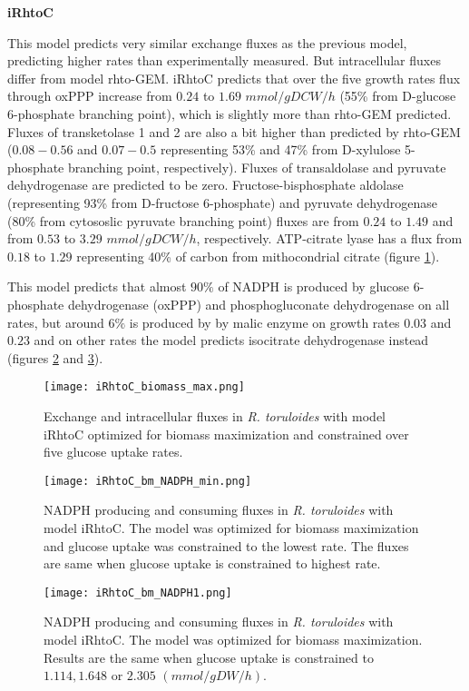 \textbf{iRhtoC}

This model predicts very similar exchange fluxes as the previous model, predicting higher rates than experimentally measured. 
But intracellular fluxes differ from model rhto-GEM. iRhtoC predicts that over the five growth rates
flux through oxPPP increase from $0.24$ to $1.69$ $mmol/gDCW/h$ (55\% from D-glucose 6-phosphate branching point), 
which is slightly more than rhto-GEM predicted.
Fluxes of transketolase 1 and 2 are also a bit higher than predicted by rhto-GEM ($0.08-0.56$ and $0.07-0.5$ representing 
53\% and 47\% from D-xylulose 5-phosphate branching point, respectively). 
Fluxes of transaldolase and pyruvate dehydrogenase are predicted to be zero. 
Fructose-bisphosphate aldolase (representing 93\% from D-fructose 6-phosphate) and pyruvate dehydrogenase (80\% from cytososlic pyruvate 
branching point) 
fluxes are from $0.24$ to $1.49$ and from $0.53$ to $3.29$ $mmol/gDCW/h$, respectively.
ATP-citrate lyase has a flux from $0.18$ to $1.29$ representing 40\% of carbon from mithocondrial citrate (figure \ref{iRhtoC_biomass_max}). 

This model predicts that almost $90\%$ of NADPH is produced by glucose 6-phosphate dehydrogenase (oxPPP) and
phosphogluconate dehydrogenase on all rates, but around $6\%$ is produced by by malic enzyme on growth rates $0.03$ and $0.23$ and on other 
rates the model predicts isocitrate dehydrogenase instead (figures \ref{fig:iRhtoC_bm_NADPH0} and \ref{fig:iRhtoC_bm_NADPH1}). 
\begin{figure}[H]
    \centering
    \texttt{[image: iRhtoC\_biomass\_max.png]}
    \caption{Exchange and intracellular fluxes in \textit{R. toruloides} with model iRhtoC optimized for biomass maximization 
    and constrained over five glucose uptake rates.}
    \label{iRhtoC_biomass_max}
\end{figure}
\begin{figure}[H]
    \centering
    \texttt{[image: iRhtoC\_bm\_NADPH\_min.png]}
    \caption{NADPH producing and consuming fluxes in \textit{R. toruloides} with model iRhtoC. The model was optimized for biomass maximization and glucose 
    uptake was constrained to the lowest rate. The fluxes are same when glucose uptake is constrained to highest rate.}
    \label{fig:iRhtoC_bm_NADPH0}
\end{figure}
\begin{figure}[H]
    \centering
    \texttt{[image: iRhtoC\_bm\_NADPH1.png]}
    \caption{NADPH producing and consuming fluxes in \textit{R. toruloides} with model iRhtoC. The model was optimized for biomass maximization. 
    Results are the same when glucose uptake is constrained to $1.114, 1.648$ or $2.305$ $(mmol/gDW/h)$.}
    \label{fig:iRhtoC_bm_NADPH1}
\end{figure}


